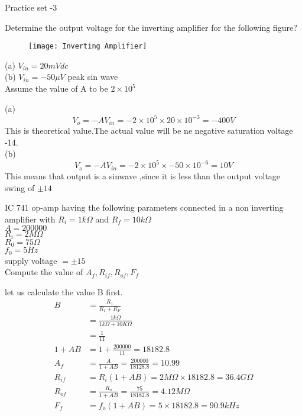 \newpage
\begin{abox}
	Practice set -3
\end{abox}
\begin{enumerate}
	\begin{minipage}{\textwidth}
		\item Determine the output voltage for the inverting amplifier for the following figure?
		\begin{figure}[H]
			\centering
			\texttt{[image: Inverting Amplifier]}
		\end{figure}
		(a) $V_{in}=20mV dc$\\
		(b) $V_{in}=-50\mu V$ peak sin wave\\
		Assume the value of A to be $2\times 10^5$
	\end{minipage}
	\begin{answer}$\left. \right. $\\
		(a) $$V_o=-AV_{in}=-2\times 10^5\times20 \times 10^{-3}=-400V$$
		This is theoretical value.The actual value will be ne negative saturation voltage -14.\\
		(b)$$V_o=-AV_{in}=-2\times 10^5\times -50 \times 10^{-6}=10V$$
		This means that output is a sinwave ,since it is less than the output voltage swing of $\pm14$
	\end{answer}
	\begin{minipage}{\textwidth}
		\item IC 741 op-amp having the following parameters connected in a non inverting amplifier with $R_i=1k\Omega$ and $R_f=10k\Omega$\\
		$A=200000$\\
		$R_i=2M\Omega$\\
		$R_0=75\Omega$\\
		$f_0=5Hz$\\
		supply voltage $=\pm15$\\
		Compute the value of $A_f,R_{if},R_{of},F_f$
	\end{minipage}
	\begin{answer}
		let us calculate the value B first.
		\begin{align*}
		B&=\frac{R_1}{R_1+R_F}\\&=\frac{1k\Omega}{1k\Omega+10K\Omega}\\&=\frac{1}{11}\\
		1+AB&=1+\frac{200000}{11}=18182.8\\
		A_f&=\frac{A}{1+AB}=\frac{200000}{18128.8}=10.99\\
		R_{if}&=R_i(1+AB)=2M\Omega\times 18182.8=36.4G\Omega\\
		R_{of}&=\frac{R_o}{1+AB}=\frac{75}{18182.8}=4.12M\Omega\\
		F_f&=f_o(1+AB)=5\times 18182.8=90.9kHz
		\end{align*}
		

\end{answer}
\end{enumerate}
